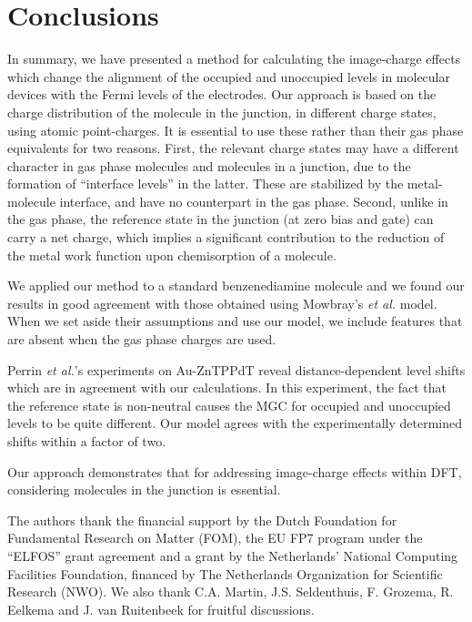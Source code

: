 \documentclass[aip,jcp,a4paper,reprint,floatfix,superscriptaddress]{revtex4-1}
\newcommand{\etal}{\emph{et al.}\xspace}
\begin{document}
\section{Conclusions}

In summary, we have presented a method for calculating the image-charge effects which change the alignment of the occupied and unoccupied levels in molecular devices with the Fermi levels of the electrodes. Our approach is based on the charge distribution of the molecule in the junction, in different charge states, using atomic point-charges. It is essential to use these rather than their gas phase equivalents for two reasons. First, the relevant charge states may have a different character in gas phase molecules and molecules in a junction, due to the formation of ``interface levels'' in the latter. These are stabilized by the metal-molecule interface, and have no counterpart in the gas phase. Second, unlike in the gas phase, the reference state in the junction (at zero bias and gate) can carry a net charge, which implies a significant contribution to the reduction of the metal work function upon chemisorption of a molecule.

We applied our method to a standard benzenediamine molecule and we found our results in good agreement with those obtained using Mowbray's \etal model. When we set aside their assumptions and use our model, we include features that are absent when the gas phase charges are used. 

Perrin \etal's\cite{Perrin2013} experiments on Au-ZnTPPdT reveal distance-dependent level shifts which are in agreement with our calculations. In this experiment, the fact that the reference state is non-neutral causes the MGC for occupied and unoccupied levels to be quite different. 
Our model agrees with the experimentally determined shifts within a factor of two.

Our approach demonstrates that for addressing image-charge effects within DFT, considering molecules in the junction is essential.

\begin{acknowledgements}
The authors thank the financial support by the Dutch Foundation for Fundamental Research on Matter (FOM), the EU FP7 program under the ``ELFOS'' grant agreement and a grant by the Netherlands' National Computing Facilities Foundation, financed by The Netherlands Organization for Scientific Research (NWO). We also thank C.A. Martin, J.S. Seldenthuis, F. Grozema, R. Eelkema and J. van Ruitenbeek for fruitful discussions.
\end{acknowledgements}
\end{document}
